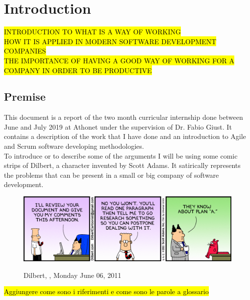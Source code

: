 \chapter{Introduction}
\label{introduction}

%
%
%
%

\hl{INTRODUCTION TO WHAT IS A WAY OF WORKING\\HOW IT IS APPLIED IN MODERN SOFTWARE DEVELOPMENT COMPANIES\\THE IMPORTANCE OF HAVING A GOOD WAY OF WORKING FOR A COMPANY IN ORDER TO BE PRODUCTIVE}

\section{Premise}
	This document is a report of the two month curricular internship done between June and July 2019 at Athonet under the supervision of Dr. Fabio Giust.
	It contains a description of the work that I have done and an introduction to Agile and Scrum software developing methodologies.\\
	To introduce or to describe some of the arguments I will be using some comic strips of Dilbert, a character invented by Scott Adams.
	It satirically represents the problems that can be present in a small or big company of software development.
	\begin{figure}[H]
		\centering
		\includegraphics[width=1\textwidth]{resources/Dissertate}\\
		\caption[Dilbert, ]{Dilbert, , Monday June 06, 2011}
	\end{figure}
	\hl{Aggiungere come sono i riferimenti e come sono le parole a glossario}
	
